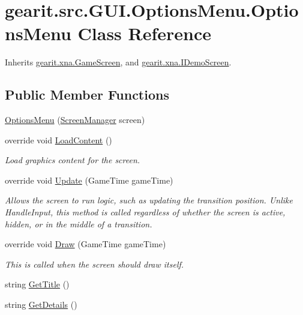 \hypertarget{classgearit_1_1src_1_1_g_u_i_1_1_options_menu_1_1_options_menu}{\section{gearit.\+src.\+G\+U\+I.\+Options\+Menu.\+Options\+Menu Class Reference}
\label{classgearit_1_1src_1_1_g_u_i_1_1_options_menu_1_1_options_menu}
}


Inherits \hyperlink{classgearit_1_1xna_1_1_game_screen}{gearit.\+xna.\+Game\+Screen}, and \hyperlink{interfacegearit_1_1xna_1_1_i_demo_screen}{gearit.\+xna.\+I\+Demo\+Screen}.

\subsection*{Public Member Functions}
\begin{DoxyCompactItemize}
\item 
\hyperlink{classgearit_1_1src_1_1_g_u_i_1_1_options_menu_1_1_options_menu_a12b555fa9fd95aecc63cdb635fa6e5a8}{Options\+Menu} (\hyperlink{classgearit_1_1xna_1_1_screen_manager}{Screen\+Manager} screen)
\item 
override void \hyperlink{classgearit_1_1src_1_1_g_u_i_1_1_options_menu_1_1_options_menu_a8bdb740cd60c8f74d95216dc5a479f0c}{Load\+Content} ()
\begin{DoxyCompactList}\small\item\em Load graphics content for the screen. \end{DoxyCompactList}\item 
override void \hyperlink{classgearit_1_1src_1_1_g_u_i_1_1_options_menu_1_1_options_menu_ae6bd9317204c0153c60aa3e99c431d26}{Update} (Game\+Time game\+Time)
\begin{DoxyCompactList}\small\item\em Allows the screen to run logic, such as updating the transition position. Unlike Handle\+Input, this method is called regardless of whether the screen is active, hidden, or in the middle of a transition. \end{DoxyCompactList}\item 
override void \hyperlink{classgearit_1_1src_1_1_g_u_i_1_1_options_menu_1_1_options_menu_a8e6bb40613b1eb1ce6cf7e45cbf8ea6e}{Draw} (Game\+Time game\+Time)
\begin{DoxyCompactList}\small\item\em This is called when the screen should draw itself. \end{DoxyCompactList}\item 
string \hyperlink{classgearit_1_1src_1_1_g_u_i_1_1_options_menu_1_1_options_menu_a866e74c3d7803ef7d6e060a0482d624d}{Get\+Title} ()
\item 
string \hyperlink{classgearit_1_1src_1_1_g_u_i_1_1_options_menu_1_1_options_menu_ad55b15d535b42c81fe08480eb7d3f259}{Get\+Details} ()
\end{DoxyCompactItemize}
